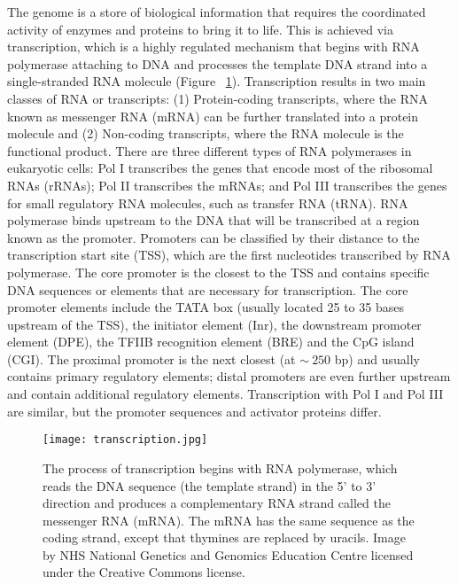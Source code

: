 The genome is a store of biological information that requires the coordinated activity of enzymes and proteins to bring it to life. This is achieved via transcription, which is a highly regulated mechanism that begins with RNA polymerase attaching to DNA and processes the template DNA strand into a single-stranded RNA molecule (Figure ~\ref{fig:transcription}). Transcription results in two main classes of RNA or transcripts: (1) Protein-coding transcripts, where the RNA known as messenger RNA (mRNA) can be further translated into a protein molecule and (2) Non-coding transcripts, where the RNA molecule is the functional product. There are three different types of RNA polymerases in eukaryotic cells: Pol I transcribes the genes that encode most of the ribosomal RNAs (rRNAs); Pol II transcribes the mRNAs; and Pol III transcribes the genes for small regulatory RNA molecules, such as transfer RNA (tRNA). RNA polymerase binds upstream to the DNA that will be transcribed at a region known as the promoter. Promoters can be classified by their distance to the transcription start site (TSS), which are the first nucleotides transcribed by RNA polymerase. The core promoter is the closest to the TSS and contains specific DNA sequences or elements that are necessary for transcription. The core promoter elements include the TATA box (usually located 25 to 35 bases upstream of the TSS), the initiator element (Inr), the downstream promoter element (DPE), the TFIIB recognition element (BRE) and the CpG island (CGI). The proximal promoter is the next closest (at $\sim~250$ bp) and usually contains primary regulatory elements; distal promoters are even further upstream and contain additional regulatory elements. Transcription with Pol I and Pol III are similar, but the promoter sequences and activator proteins differ.

\begin{figure}[h]
   \centering
   \texttt{[image: transcription.jpg]}
   \caption[DNA transcription]{The process of transcription begins with RNA polymerase, which reads the DNA sequence (the template strand) in the 5' to 3' direction and produces a complementary RNA strand called the messenger RNA (mRNA). The mRNA has the same sequence as the coding strand, except that thymines are replaced by uracils. Image by NHS National Genetics and Genomics Education Centre licensed under the Creative Commons license.}
   \label{fig:transcription}
\end{figure}


